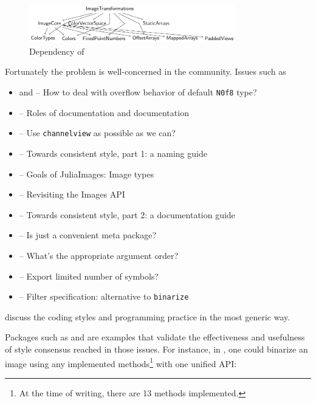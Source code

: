 \begin{figure}[h]
  \centering
  \includegraphics[width=0.8\textwidth]{figures/imagetransformations_dep.pdf}
  \caption{Dependency of \imagetransformations{}}\label{fig:imagetransformations_dep}
\end{figure}

Fortunately the problem is well-concerned in the community. Issues such as
{\small
\begin{itemize}
    \item {} and  -- How to deal with overflow behavior of default \texttt{N0f8} type?
    \item {} -- Roles of  documentation and  documentation
    \item {} -- Use \texttt{channelview} as possible as we can?
    \item {} -- Towards consistent style, part 1: a naming guide
    \item {} -- Goals of JuliaImages: Image types
    \item {} -- Revisiting the Images API
    \item {} -- Towards consistent style, part 2: a documentation guide
    \item {} -- Is \images{} just a convenient meta package?
    \item {} -- What's the appropriate argument order?
    \item {} -- Export limited number of symbols?
    \item {} -- Filter specification: alternative to \texttt{binarize}
\end{itemize}
}
discuss the coding styles and programming practice in the most generic way. \par

Packages such as \repohistogramthresholding and \repoimagebinarization are examples that validate the effectiveness and usefulness of style consensus reached in those issues. For instance, in \imagebinarization, one could binarize an image using any implemented methods\footnote{At the time of writing, there are 13 methods implemented.} with one unified API:


